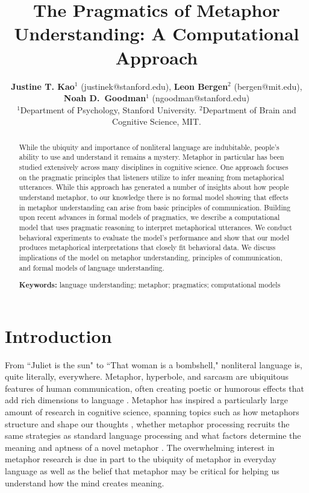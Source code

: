 \documentclass[10pt,letterpaper]{article}
\title{The Pragmatics of Metaphor Understanding: A Computational Approach}
\author{{\large {\bf Justine T. Kao$^1$} (justinek@stanford.edu)}, {\large {\bf Leon Bergen$^2$} (bergen@mit.edu)}, {\large {\bf Noah D.~Goodman$^1$} (ngoodman@stanford.edu)}\\
  $^1$Department of Psychology, Stanford University. $^2$Department of Brain and Cognitive Science, MIT. }
\begin{document}
\maketitle
\begin{abstract}
While the ubiquity and importance of nonliteral language are indubitable, people's ability to use and understand it remains a mystery. Metaphor in particular has been studied extensively across many disciplines in cognitive science. One approach focuses on the pragmatic principles that listeners utilize to infer meaning from metaphorical utterances. While this approach has generated a number of insights about how people understand metaphor, to our knowledge there is no formal model showing that effects in metaphor understanding can arise from basic principles of communication. Building upon recent advances in formal models of pragmatics, we describe a computational model that uses pragmatic reasoning to interpret metaphorical utterances. We conduct behavioral experiments to evaluate the model's performance and show that our model produces metaphorical interpretations that closely fit behavioral data. We discuss implications of the model on metaphor understanding, principles of communication, and formal models of language understanding.

\textbf{Keywords:} 
language understanding; metaphor; pragmatics; computational models
\end{abstract}


\section{Introduction}
From ``Juliet is the sun" to ``That woman is a bombshell," nonliteral language is, quite literally, everywhere. Metaphor, hyperbole, and sarcasm are ubiquitous features of human communication, often creating poetic or humorous effects that add rich dimensions to language \cite{glucksberg2001understanding, pilkington2000poetic, lakoff2009more, roberts1994people}. Metaphor has inspired a particularly large amount of research in cognitive science, spanning topics such as how metaphors structure and shape our thoughts \cite{ortony1993metaphor, lakoff1993contemporary, thibodeau2011metaphors}, whether metaphor processing recruits the same strategies as standard language processing \cite{giora1997understanding, gibbs2002new, glucksberg1993metaphors} and what factors determine the meaning and aptness of a novel metaphor \cite{blasko1993effects, tourangeau1981aptness, kintsch2002metaphor}. The overwhelming interest in metaphor research is due in part to the ubiquity of metaphor in everyday language as well as the belief that metaphor may be critical for helping us understand how the mind creates meaning. 
\end{document}
